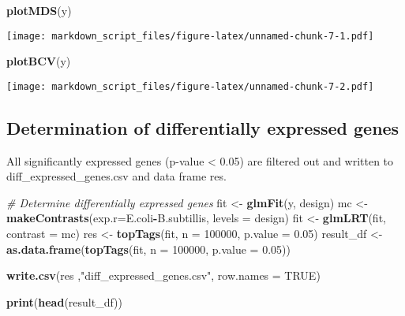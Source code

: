 \documentclass[]{article}
\newenvironment{Shaded}{\begin{snugshade}}{\end{snugshade}}
\newcommand{\KeywordTok}[1]{\textcolor[rgb]{0.13,0.29,0.53}{\textbf{#1}}}
\newcommand{\DataTypeTok}[1]{\textcolor[rgb]{0.13,0.29,0.53}{#1}}
\newcommand{\DecValTok}[1]{\textcolor[rgb]{0.00,0.00,0.81}{#1}}
\newcommand{\FloatTok}[1]{\textcolor[rgb]{0.00,0.00,0.81}{#1}}
\newcommand{\StringTok}[1]{\textcolor[rgb]{0.31,0.60,0.02}{#1}}
\newcommand{\CommentTok}[1]{\textcolor[rgb]{0.56,0.35,0.01}{\textit{#1}}}
\newcommand{\OtherTok}[1]{\textcolor[rgb]{0.56,0.35,0.01}{#1}}
\newcommand{\OperatorTok}[1]{\textcolor[rgb]{0.81,0.36,0.00}{\textbf{#1}}}
\newcommand{\NormalTok}[1]{#1}
\begin{document}
\begin{Shaded}
\begin{Highlighting}[]
  \KeywordTok{plotMDS}\NormalTok{(y)}
\end{Highlighting}
\end{Shaded}

\texttt{[image: markdown\_script\_files/figure-latex/unnamed-chunk-7-1.pdf]}

\begin{Shaded}
\begin{Highlighting}[]
  \KeywordTok{plotBCV}\NormalTok{(y)}
\end{Highlighting}
\end{Shaded}

\texttt{[image: markdown\_script\_files/figure-latex/unnamed-chunk-7-2.pdf]}

\subsection{Determination of differentially expressed
genes}\label{determination-of-differentially-expressed-genes}

All significantly expressed genes (p-value \textless{} 0.05) are
filtered out and written to diff\_expressed\_genes.csv and data frame
res.

\begin{Shaded}
\begin{Highlighting}[]
\CommentTok{# Determine differentially expressed genes}
\NormalTok{fit <-}\StringTok{ }\KeywordTok{glmFit}\NormalTok{(y, design)}
\NormalTok{mc  <-}\StringTok{ }\KeywordTok{makeContrasts}\NormalTok{(}\DataTypeTok{exp.r=}\NormalTok{E.coli}\OperatorTok{-}\NormalTok{B.subtillis, }\DataTypeTok{levels =}\NormalTok{ design)}
\NormalTok{fit <-}\StringTok{ }\KeywordTok{glmLRT}\NormalTok{(fit, }\DataTypeTok{contrast =}\NormalTok{ mc)}
\NormalTok{res <-}\StringTok{ }\KeywordTok{topTags}\NormalTok{(fit, }\DataTypeTok{n =} \DecValTok{100000}\NormalTok{, }\DataTypeTok{p.value =} \FloatTok{0.05}\NormalTok{)}
\NormalTok{result_df <-}\StringTok{ }\KeywordTok{as.data.frame}\NormalTok{(}\KeywordTok{topTags}\NormalTok{(fit, }\DataTypeTok{n =} \DecValTok{100000}\NormalTok{, }\DataTypeTok{p.value =} \FloatTok{0.05}\NormalTok{))}
  
\KeywordTok{write.csv}\NormalTok{(res ,}\StringTok{"diff_expressed_genes.csv"}\NormalTok{, }\DataTypeTok{row.names =} \OtherTok{TRUE}\NormalTok{)}

\KeywordTok{print}\NormalTok{(}\KeywordTok{head}\NormalTok{(result_df))}
\end{Highlighting}
\end{Shaded}
\end{document}
